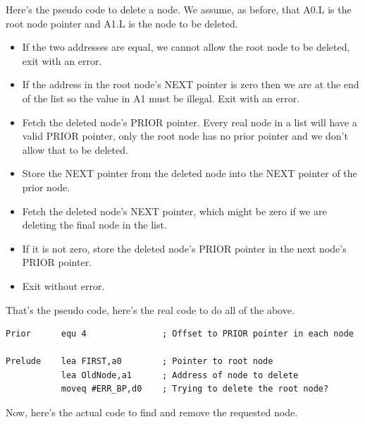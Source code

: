 Here's the pseudo code to delete a node. We assume, as before,
      that A0.L is the root node pointer and A1.L is the node to be
      deleted.
\begin{itemize}[itemsep=0pt]

\item{}If the two addresses are equal, we cannot allow the root node
          to be deleted, exit with an error.


\item{}If the address in the root node's NEXT pointer is zero then we
          are at the end of the list so the value in A1 must be illegal. Exit
          with an error.


\item{}Fetch the deleted node's PRIOR pointer. Every real node in a
          list will have a valid PRIOR pointer, only the root node has no
          prior pointer and we don't allow that to be deleted.


\item{}Store the NEXT pointer from the deleted node into the NEXT
          pointer of the prior node.


\item{}Fetch the deleted node's NEXT pointer, which might be zero if
          we are deleting the final node in the list.


\item{}If it is not zero, store the deleted node's PRIOR pointer in
          the next node's PRIOR pointer.


\item{}Exit without error.

\end{itemize}

That's the pseudo code, here's the real code to do all of the
      above.

\begin{lstlisting}[firstnumber=1,caption={Deleting a Node - Prelude},label={lst:DeletingANodePrelude2}]
Prior      equ 4               ; Offset to PRIOR pointer in each node

Prelude    lea FIRST,a0        ; Pointer to root node
           lea OldNode,a1      ; Address of node to delete
           moveq #ERR_BP,d0    ; Trying to delete the root node?
\end{lstlisting}

Now, here's the actual code to find and remove the requested
      node.

